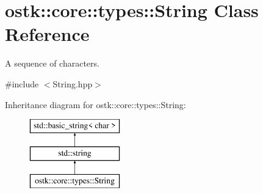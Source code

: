 \hypertarget{classostk_1_1core_1_1types_1_1_string}{}\section{ostk\+:\+:core\+:\+:types\+:\+:String Class Reference}
\label{classostk_1_1core_1_1types_1_1_string}


A sequence of characters.  




{\ttfamily \#include $<$String.\+hpp$>$}

Inheritance diagram for ostk\+:\+:core\+:\+:types\+:\+:String\+:\begin{figure}[H]
\begin{center}
\leavevmode
\includegraphics[height=3.000000cm]{classostk_1_1core_1_1types_1_1_string}
\end{center}
\end{figure}
